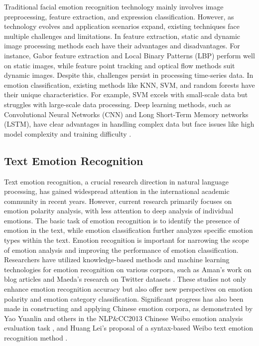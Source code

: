\documentclass[preprint,12pt]{elsarticle}
\begin{document}
Traditional facial emotion recognition technology mainly involves image preprocessing, feature extraction, and expression classification. However, as technology evolves and application scenarios expand, existing techniques face multiple challenges and limitations. In feature extraction, static and dynamic image processing methods each have their advantages and disadvantages. For instance, Gabor feature extraction  \cite{ref7} and Local Binary Patterns (LBP) \cite{ref8} perform well on static images, while feature point tracking and optical flow methods suit dynamic images. Despite this, challenges persist in processing time-series data. In emotion classification, existing methods like KNN, SVM, and random forests have their unique characteristics. For example, SVM excels with small-scale data but struggles with large-scale data processing. Deep learning methods, such as Convolutional Neural Networks (CNN) and Long Short-Term Memory networks (LSTM), have clear advantages in handling complex data but face issues like high model complexity and training difficulty \cite{ref9, ref10}.

\subsection{Text Emotion Recognition}

Text emotion recognition, a crucial research direction in natural language processing, has gained widespread attention in the international academic community in recent years. However, current research primarily focuses on emotion polarity analysis, with less attention to deep analysis of individual emotions. The basic task of emotion recognition is to identify the presence of emotion in the text, while emotion classification further analyzes specific emotion types within the text. Emotion recognition is important for narrowing the scope of emotion analysis and improving the performance of emotion classification. Researchers have utilized knowledge-based methods and machine learning technologies for emotion recognition on various corpora, such as Aman's work on blog articles and Maeda's research on Twitter datasets \cite{ref11, ref12}. These studies not only enhance emotion recognition accuracy but also offer new perspectives on emotion polarity and emotion category classification. Significant progress has also been made in constructing and applying Chinese emotion corpora, as demonstrated by Yao Yuanlin and others in the NLP\&CC2013 Chinese Weibo emotion analysis evaluation task \cite{ref13}, and Huang Lei's proposal of a syntax-based Weibo text emotion recognition method \cite{ref14}.
\end{document}
